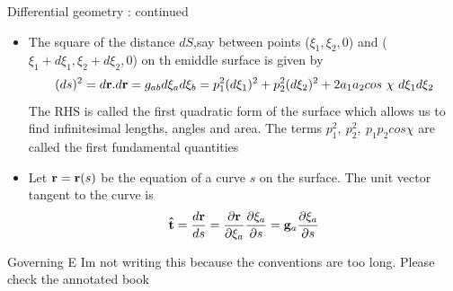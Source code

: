 	\begin{frame}{Differential geometry : continued}
		\begin{itemize}
			\item The square of the distance $dS$,say between points ($\xi_1,\xi_2,0$) and ($\xi_1 + d\xi_1,\xi_2+d\xi_2,0$) on th emiddle surface is given by
			\begin{equation}
			 (ds)^2 = d\mathbf{r}. d\mathbf{r} = g_{ab}d\xi_a d\xi_b = p_1^2(d\xi_1)^2 + p_2^2(d\xi_2)^2 + 2a_1a_2cos~\chi~d\xi_1 d\xi_2
			\end{equation}
			The RHS is called the first quadratic form of the surface which allows us to find infinitesimal lengths, angles and area. The terms $p_1^2,~p_2^2,~p_1p_2cos\chi$ are called the first fundamental quantities
			\item Let $\mathbf{r}= \mathbf{r}(s)$ be the equation of a curve $s$ on the surface. The unit vector tangent to the curve is
			\begin{equation}
				\mathbf{\hat{t}} =  \frac{d \mathbf{r}}{d   s} = \frac{\partial \mathbf{r}}{\partial \xi_a} \frac{\partial \xi_a}{\partial s} = \mathbf{g}_a \frac{\partial \xi_a}{\partial s}
			\end{equation}			
		\end{itemize}
	\end{frame}


	\begin{frame}{Governing E}
		Im not writing this because the conventions are too long. Please check the annotated book
	\end{frame}


